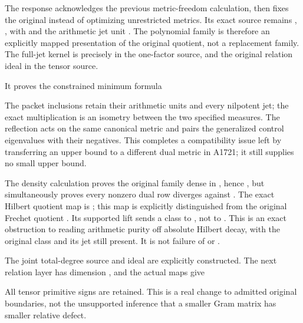 The response acknowledges the previous metric-freedom calculation, then
fixes the original \protect{} instead of optimizing unrestricted
metrics. Its exact source remains \protect{},
\protect{}, with \protect{}
and the arithmetic jet unit \protect{}. The
polynomial family is therefore an explicitly mapped presentation of the
original quotient, not a replacement family. The full-jet kernel is
precisely \protect{} in the one-factor source, and the
original relation ideal in the tensor source.

It proves the constrained minimum formula


The packet inclusions retain their arithmetic units and every nilpotent
jet; the exact multiplication \protect{} is an isometry
between the two specified measures. The reflection acts on the same
canonical metric and pairs the generalized control eigenvalues with
their negatives. This completes a compatibility issue left by
transferring an upper bound to a different dual metric in A1721; it
still supplies no small upper bound.

The density calculation proves the original \protect{}
family dense in \protect{}, hence \protect{},
but simultaneously proves every nonzero dual row diverges against
\protect{}. The exact Hilbert quotient map is
\protect{}; this map is explicitly
distinguished from the original Frechet quotient \protect{}. Its
supported lift sends a class to \protect{}, not to
\protect{}. This is an exact obstruction to reading arithmetic
purity off absolute Hilbert decay, with the original class and its jet
still present. It is not failure of \protect{} or
\protect{}.

The joint total-degree source and ideal are explicitly constructed. The
next relation layer has dimension \protect{}, and the
actual maps \protect{} give


All tensor primitive signs are retained. This is a real change to
admitted original boundaries, not the unsupported inference that a
smaller Gram matrix has smaller relative defect.

